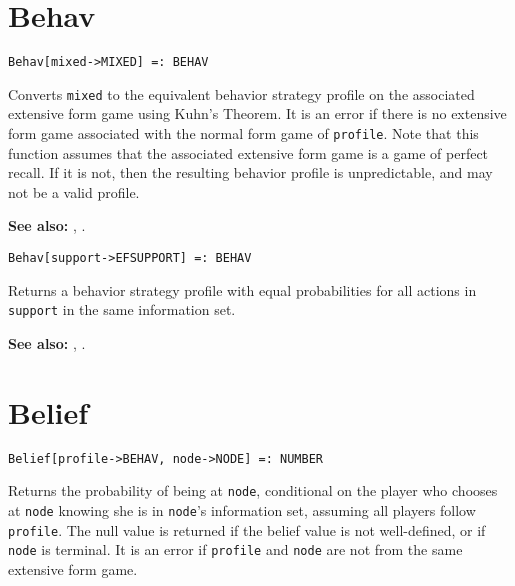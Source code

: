 \section*{Behav}\label{PrimBehav}
\begin{verbatim}
Behav[mixed->MIXED] =: BEHAV 
\end{verbatim}
\noindent
Converts \verb+mixed+ to the equivalent behavior strategy profile on
the associated extensive form game using Kuhn's Theorem.  It is an
error if there is no extensive form game associated with the normal
form game of \verb+profile+.  Note that this function assumes that the
associated extensive form game is a game of perfect recall.  If it is
not, then the resulting behavior profile is unpredictable, and may not
be a valid profile.

\vspace{12pt} \noindent
\textbf{See also:} 
,
.

\latexignore{\hrule}

\begin{verbatim}
Behav[support->EFSUPPORT] =: BEHAV 
\end{verbatim}

\noindent
Returns a behavior strategy profile with equal
probabilities for all actions in \verb+support+ in the same information set. 

\vspace{12pt} \noindent
\textbf{See also:} ,
.


\section*{Belief}\label{PrimBelief}
\begin{verbatim}
Belief[profile->BEHAV, node->NODE] =: NUMBER 
\end{verbatim}

\noindent
Returns the probability of being at \verb+node+, conditional on the
player who chooses at \verb+node+ knowing she is in \verb+node+'s
information set, assuming all players follow \verb+profile+.  The null
value is returned if the belief value is not well-defined, or if
\verb+node+ is terminal.  It is an error if \verb+profile+ and \verb+node+
are not from the same extensive form game.

